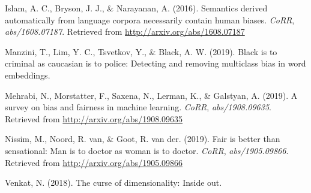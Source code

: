 \documentclass[12pt,]{book}
\begin{document}
\hypertarget{ref-Caliskan2017Semantics}{}
Islam, A. C., Bryson, J. J., \& Narayanan, A. (2016). Semantics derived
automatically from language corpora necessarily contain human biases.
\emph{CoRR}, \emph{abs/1608.07187}. Retrieved from
\url{http://arxiv.org/abs/1608.07187}

\hypertarget{ref-Manzini2019blackToCriminal}{}
Manzini, T., Lim, Y. C., Tsvetkov, Y., \& Black, A. W. (2019). Black is
to criminal as caucasian is to police: Detecting and removing multiclass
bias in word embeddings.

\hypertarget{ref-Mehrabi2019Survey}{}
Mehrabi, N., Morstatter, F., Saxena, N., Lerman, K., \& Galstyan, A.
(2019). A survey on bias and fairness in machine learning. \emph{CoRR},
\emph{abs/1908.09635}. Retrieved from
\url{http://arxiv.org/abs/1908.09635}

\hypertarget{ref-Nissim2019Fair}{}
Nissim, M., Noord, R. van, \& Goot, R. van der. (2019). Fair is better
than sensational: Man is to doctor as woman is to doctor. \emph{CoRR},
\emph{abs/1905.09866}. Retrieved from
\url{http://arxiv.org/abs/1905.09866}

\hypertarget{ref-Venkat2018Curse}{}
Venkat, N. (2018). The curse of dimensionality: Inside out.
\end{document}
